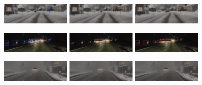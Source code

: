 \documentclass[report.tex]{subfiles}
\begin{document}
    \begin{figure}[h!]
        \centering
        \includegraphics[width=0.3\textwidth]{images/results/hrfuser/samples/day_snow/2018-02-07_11-54-15_00440.png}
        \includegraphics[width=0.3\textwidth]{images/results/hrfuser/samples/day_snow/2018-02-07_11-54-15_00440_former_c.png}
        \includegraphics[width=0.3\textwidth]{images/results/hrfuser/samples/day_snow/2018-02-07_11-54-15_00440_former_clr.png}
      
        \includegraphics[width=0.3\textwidth]{images/results/hrfuser/samples/clear_night/2018-02-04_18-18-20_00100_gt.png}
        \includegraphics[width=0.3\textwidth]{images/results/hrfuser/samples/clear_night/2018-02-04_18-18-20_00100_former_c.png}
        \includegraphics[width=0.3\textwidth]{images/results/hrfuser/samples/clear_night/2018-02-04_18-18-20_00100_former_clr.png}
      
        \includegraphics[width=0.3\textwidth]{images/results/hrfuser/samples/dense_fog_camera_fails/2018-10-29_15-02-37_00900_gt.png}
        \includegraphics[width=0.3\textwidth]{images/results/hrfuser/samples/dense_fog_camera_fails/2018-10-29_15-02-37_00900_former.png}
        \includegraphics[width=0.3\textwidth]{images/results/hrfuser/samples/dense_fog_camera_fails/2018-10-29_15-02-37_00900_former_clr.png}
      

\end{figure}
\end{document}
